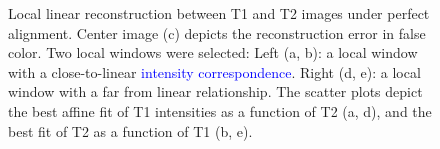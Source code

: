 \begin{figure}[t!]
    \caption{{\small Local linear reconstruction between T1 and T2 images under perfect alignment. Center image (c) depicts the reconstruction error in false color. Two local windows were selected: Left (a, b): a local window with a close-to-linear \textcolor{blue}{intensity correspondence}. Right (d, e): a local window with a far from linear relationship. The scatter plots depict the best affine fit of T1 intensities as a function of T2 (a, d), and the best fit of T2 as a function of T1 (b, e).}}
\label{fig:llr_test}\figcloser
\end{figure}





